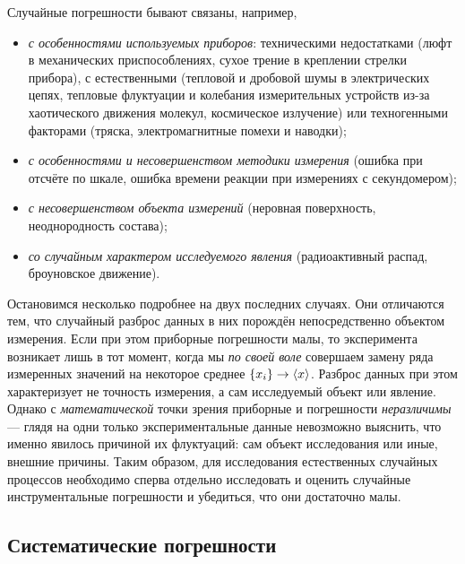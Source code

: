 Случайные погрешности бывают связаны, например,
\begin{itemize}\small
    \item \emph{с особенностями используемых приборов}: техническими
недостатками
(люфт в механических приспособлениях, сухое трение в креплении стрелки
прибора), с естественными (тепловой и дробовой шумы в электрических
цепях, тепловые флуктуации и колебания измерительных устройств из-за
хаотического движения молекул, космическое излучение) или техногенными
факторами (тряска, электромагнитные помехи и наводки);

    \item \emph{с особенностями и несовершенством методики измерения} (ошибка
при отсчёте по шкале, ошибка времени реакции при измерениях с секундомером);

    \item \emph{с несовершенством объекта измерений} (неровная поверхность,
неоднородность состава);

    \item \emph{со случайным характером исследуемого явления} (радиоактивный
распад, броуновское движение).
\end{itemize}

Остановимся несколько подробнее на двух последних случаях. Они отличаются
тем, что случайный разброс данных в них порождён непосредственно объектом
измерения. Если при этом приборные погрешности малы, то 
эксперимента возникает лишь в тот момент, когда мы \emph{по своей
воле} совершаем замену ряда измеренных значений на некоторое среднее
$\left\{ x_{i}\right\} \to\left<x\right>$. Разброс данных при этом
характеризует не точность измерения, а сам исследуемый объект или
явление. Однако с \emph{математической} точки зрения приборные и
погрешности \emph{неразличимы} --- глядя на одни только
экспериментальные данные невозможно выяснить, что именно явилось причиной
их флуктуаций: сам объект исследования или иные, внешние причины.
Таким образом, для исследования естественных случайных процессов необходимо
сперва отдельно исследовать и оценить случайные инструментальные погрешности
и убедиться, что они достаточно малы.


\subsection{Систематические погрешности}

